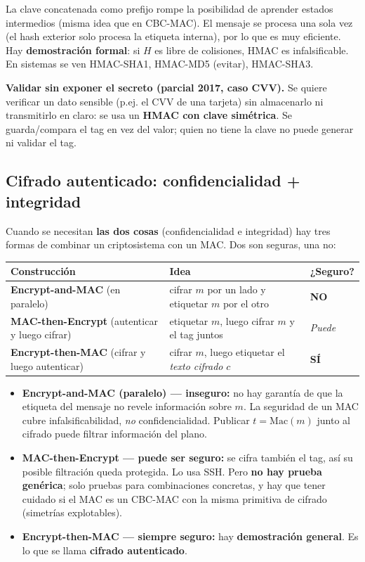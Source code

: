 \documentclass[../main.tex]{subfiles}
\begin{document}
La clave concatenada como prefijo rompe la posibilidad de aprender estados
intermedios (misma idea que en CBC-MAC). El mensaje se procesa una sola vez (el hash
exterior solo procesa la etiqueta interna), por lo que es muy eficiente. Hay
\textbf{demostración formal}: si $H$ es libre de colisiones, HMAC es infalsificable.
En sistemas se ven HMAC-SHA1, HMAC-MD5 (evitar), HMAC-SHA3.

\begin{examen}
\textbf{Validar sin exponer el secreto (parcial 2017, caso CVV).} Se quiere verificar
un dato sensible (p.ej. el CVV de una tarjeta) sin almacenarlo ni transmitirlo en
claro: se usa un \textbf{HMAC con clave simétrica}. Se guarda/compara el tag en vez
del valor; quien no tiene la clave no puede generar ni validar el tag.
\end{examen}

\subsection{Cifrado autenticado: confidencialidad + integridad}

Cuando se necesitan \textbf{las dos cosas} (confidencialidad e integridad) hay tres
formas de combinar un criptosistema con un MAC. Dos son seguras, una no:

\begin{center}
\renewcommand{\arraystretch}{1.25}
\begin{tabular}{p{4.6cm}p{6.2cm}p{2.2cm}}
\toprule
\textbf{Construcción} & \textbf{Idea} & \textbf{¿Seguro?} \\
\midrule
\textbf{Encrypt-and-MAC} (en paralelo) & cifrar $m$ por un lado y etiquetar $m$ por el otro & \textbf{NO} \\
\textbf{MAC-then-Encrypt} (autenticar y luego cifrar) & etiquetar $m$, luego cifrar $m$ y el tag juntos & \emph{Puede} \\
\textbf{Encrypt-then-MAC} (cifrar y luego autenticar) & cifrar $m$, luego etiquetar el \emph{texto cifrado} $c$ & \textbf{SÍ} \\
\bottomrule
\end{tabular}
\end{center}

\begin{itemize}[leftmargin=1.4em]
  \item \textbf{Encrypt-and-MAC (paralelo) — inseguro:} no hay garantía de que la
  etiqueta del mensaje no revele información sobre $m$. La seguridad de un MAC cubre
  infalsificabilidad, \emph{no} confidencialidad. Publicar $t=\mathrm{Mac}(m)$ junto al
  cifrado puede filtrar información del plano.
  \item \textbf{MAC-then-Encrypt — puede ser seguro:} se cifra también el tag, así su
  posible filtración queda protegida. Lo usa SSH. Pero \textbf{no hay prueba genérica};
  solo pruebas para combinaciones concretas, y hay que tener cuidado si el MAC es un
  CBC-MAC con la misma primitiva de cifrado (simetrías explotables).
  \item \textbf{Encrypt-then-MAC — siempre seguro:} hay \textbf{demostración general}.
  Es lo que se llama \textbf{cifrado autenticado}.
\end{itemize}
\end{document}

